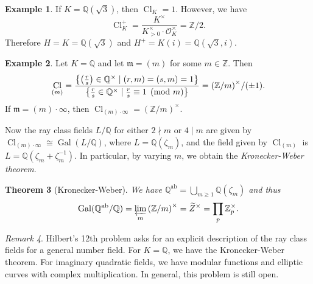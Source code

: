 \documentclass[leqno, openany]{memoir}
\newtheorem{thm}{Theorem}[section]
\theoremstyle{definition}
\newtheorem{exm}[thm]{Example}
\theoremstyle{remark}
\newtheorem{rmk}[thm]{Remark}
\theoremstyle{plain}
\theoremstyle{definition}
\theoremstyle{remark}
\newcommand{\Z}{\mathbb{Z}}
\newcommand{\Q}{\mathbb{Q}}
\newcommand{\mc}[1]{\mathcal{#1}}
\newcommand{\mf}[1]{\mathfrak{#1}}
\newcommand{\mr}[1]{\mathrm{#1}}
\newcommand{\wt}[1]{\widetilde{#1}}
\DeclareMathOperator{\Gal}{Gal}
\DeclareMathOperator{\Cl}{Cl}
\begin{document}
\begin{exm}
    If $K = \Q(\sqrt{3})$, then $\Cl_K = \qty{1}$. However, we have
    \[ \Cl_K^+ = \frac{K^{\times}}{K_{>0}^{\times} \cdot \mc{O}_K^{\times}} = \Z/2. \]
    Therefore $H = K = \Q(\sqrt{3})$ and $H^+ = K(i) = \Q(\sqrt{3}, i)$.
\end{exm}

\begin{exm}
    Let $K = \Q$ and let $\mf{m} = (m)$ for some $m \in \Z$. Then
    \[ \Cl_{(m)} = \frac{\qty{\qty(\frac{r}{s}) \in \Q^{\times} \mid (r,m) = (s,m) = 1}}{\qty{\frac{r}{s} \in \Q^{\times} \mid \frac{r}{s} \equiv 1 \pmod m}} = {(\Z/m)}^{\times} / (\pm 1). \]
    If $\mf{m} = (m) \cdot \infty$, then $\Cl_{(m) \cdot \infty} = {(\Z/m)}^{\times}$.

    Now the ray class fields $L/\Q$ for either $2 \nmid m$ or $4 \mid m$ are given by $\Cl_{(m) \cdot \infty} \cong \Gal(L/\Q)$, where $L = \Q(\zeta_m)$, and the field given by $\Cl_{(m)}$ is $L = \Q(\zeta_m + \zeta_m^{-1})$. In particular, by varying $m$, we obtain the \textit{Kronecker-Weber theorem}. 
\end{exm}

\begin{thm}[Kronecker-Weber]
    We have $\Q^{\mr{ab}} = \bigcup_{m \geq 1} \Q(\zeta_m)$ and thus 
    \[ \Gal(\Q^{\mr{ab}}/\Q) = \varprojlim_m {(\Z/m)}^{\times} = \wt{Z}^{\times} = \prod_p \Z_p^{\times}. \]
\end{thm}

\begin{rmk}
    Hilbert's 12th problem asks for an explicit description of the ray class fields for a general number field. For $K = \Q$, we have the Kronecker-Weber theorem. For imaginary quadratic fields, we have modular functions and elliptic curves with complex multiplication. In general, this problem is still open.
\end{rmk}
\end{document}
